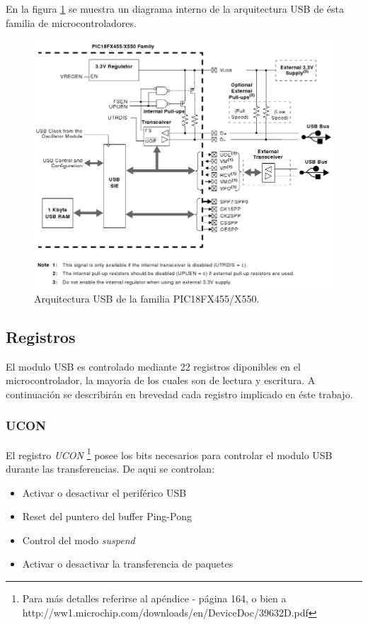 En la figura \ref{fig:pic_usb_internal} se muestra un diagrama interno de
la arquitectura USB de \'esta familia de microcontroladores.

\begin{figure}[htp]
\centering
\includegraphics[scale=0.5]{./img/pic_usb_internal.png}
\caption{Arquitectura USB de la familia PIC18FX455/X550.}
\label{fig:pic_usb_internal}
\end{figure}


\subsection{Registros}
El modulo USB es controlado mediante 22 registros diponibles en el
microcontrolador, la mayoria de los cuales son de lectura y escritura.
A continuaci\'on se describir\'an en brevedad cada registro implicado en
\'este trabajo.

\subsubsection{UCON}
El registro \emph{UCON} \footnote{Para m\'as detalles referirse al
ap\'endice - 
p\'agina 164, o bien a
http://ww1.microchip.com/downloads/en/DeviceDoc/39632D.pdf}
posee los bits necesarios para controlar el modulo USB
durante las transferencias. De aqui se controlan:

\begin{itemize}
 \item Activar o desactivar el perif\'erico USB

 \item Reset del puntero del buffer Ping-Pong  

 \item Control del modo \emph{suspend}

 \item Activar o desactivar la transferencia de paquetes
\end{itemize}

